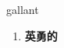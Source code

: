 
\begin{frame}
{\huge gallant}
\begin{center}
\begin{enumerate}\Large
  \item \textbf{英勇的}
\end{enumerate}
\end{center}
\end{frame}
